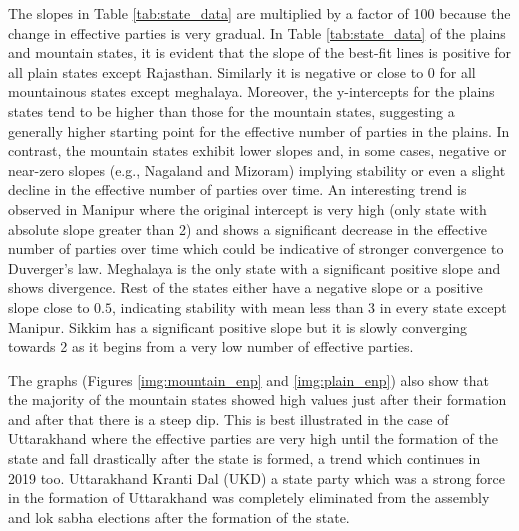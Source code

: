     \label{img:plain_enp}

    \label{img:overall_enp}

\vspace{0.3cm}

The slopes in Table \ref{tab:state_data} are multiplied by a factor of 100 because the change in effective parties is very gradual. In Table \ref{tab:state_data} of the plains and mountain states, it is evident that the slope of the best-fit lines is positive for all plain states except Rajasthan. Similarly it is negative or close to 0 for all mountainous states except meghalaya. Moreover, the y-intercepts for the plains states tend to be higher than those for the mountain states, suggesting a generally higher starting point for the effective number of parties in the plains. In contrast, the mountain states exhibit lower slopes and, in some cases, negative or near-zero slopes (e.g., Nagaland and Mizoram) implying stability or even a slight decline in the effective number of parties over time.  An interesting trend is observed in Manipur where the original intercept is very high (only state with absolute slope greater than 2) and shows a significant decrease in the effective number of parties over time which could be indicative of stronger convergence to Duverger’s law. Meghalaya is the only state with a significant positive slope and shows divergence. Rest of the states either have a negative slope or a positive slope close to $0.5$, indicating stability with mean less than 3 in every state except Manipur. Sikkim has a significant positive slope but it is slowly converging towards 2 as it begins from a very low number of effective parties.

\vspace{0.3cm}

The graphs (Figures \ref{img:mountain_enp} and \ref{img:plain_enp}) also show that the majority of the mountain states showed high values just after their formation and after that there is a steep dip. This is best illustrated in the case of Uttarakhand where the effective parties are very high until the formation of the state and fall drastically after the state is formed, a trend which continues in 2019 too. Uttarakhand Kranti Dal (UKD) a state party which was a strong force in the formation of Uttarakhand was completely eliminated from the assembly and lok sabha elections after the formation of the state.  

